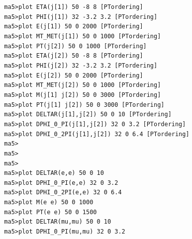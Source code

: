 \documentclass[a4paper, 10pt]{article}
\begin{document}
\texttt{ }\texttt{ }\texttt{ma5>plot ETA(j[1])     50 -8 8 [PTordering]\\
}
\texttt{ }\texttt{ }\texttt{ma5>plot PHI(j[1])     32 -3.2 3.2 [PTordering]\\
}
\texttt{ }\texttt{ }\texttt{ma5>plot E(j[1])       50 0 2000 [PTordering]\\
}
\texttt{ }\texttt{ }\texttt{ma5>plot MT\_MET(j[1])  50 0 1000 [PTordering]\\
}
\texttt{ }\texttt{ }\texttt{ma5>plot PT(j[2])      50 0 1000 [PTordering]\\
}
\texttt{ }\texttt{ }\texttt{ma5>plot ETA(j[2])     50 -8 8 [PTordering]\\
}
\texttt{ }\texttt{ }\texttt{ma5>plot PHI(j[2])     32 -3.2 3.2 [PTordering]\\
}
\texttt{ }\texttt{ }\texttt{ma5>plot E(j[2])       50 0 2000 [PTordering]\\
}
\texttt{ }\texttt{ }\texttt{ma5>plot MT\_MET(j[2])  50 0 1000 [PTordering]\\
}
\texttt{ }\texttt{ }\texttt{ma5>plot M(j[1] j[2])  50 0 3000 [PTordering]\\
}
\texttt{ }\texttt{ }\texttt{ma5>plot PT(j[1] j[2]) 50 0 3000 [PTordering]\\
}
\texttt{ }\texttt{ }\texttt{ma5>plot DELTAR(j[1],j[2])      50 0 10 [PTordering]\\
}
\texttt{ }\texttt{ }\texttt{ma5>plot DPHI\_0\_PI(j[1],j[2])   32 0 3.2 [PTordering]\\
}
\texttt{ }\texttt{ }\texttt{ma5>plot DPHI\_0\_2PI(j[1],j[2])  32 0 6.4 [PTordering]\\
}
\texttt{ }\texttt{ }\texttt{ma5>\\
}
\texttt{ }\texttt{ }\texttt{ma5>\\
}
\texttt{ }\texttt{ }\texttt{ma5>\\
}
\texttt{ }\texttt{ }\texttt{ma5>plot DELTAR(e,e)         50 0 10\\
}
\texttt{ }\texttt{ }\texttt{ma5>plot DPHI\_0\_PI(e,e)      32 0 3.2\\
}
\texttt{ }\texttt{ }\texttt{ma5>plot DPHI\_0\_2PI(e,e)     32 0 6.4\\
}
\texttt{ }\texttt{ }\texttt{ma5>plot M(e e)              50 0 1000\\
}
\texttt{ }\texttt{ }\texttt{ma5>plot PT(e e)             50 0 1500\\
}
\texttt{ }\texttt{ }\texttt{ma5>plot DELTAR(mu,mu)       50 0 10\\
}
\texttt{ }\texttt{ }\texttt{ma5>plot DPHI\_0\_PI(mu,mu)    32 0 3.2\\
}
\end{document}
